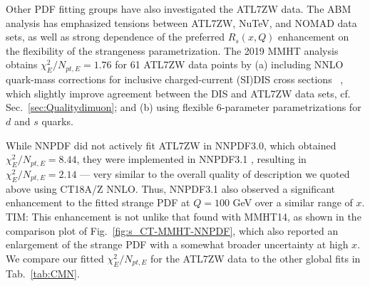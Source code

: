 Other PDF fitting groups have also investigated the ATL7ZW data. 
The ABM analysis \cite{Alekhin:2017olj} has emphasized tensions between ATL7ZW, NuTeV, and NOMAD data sets, as well as strong dependence of the preferred $R_s(x,Q)$ enhancement on the flexibility of the strangeness parametrization. The 2019 MMHT analysis \cite{Thorne:2019mpt}
obtains $\chi^2_E/N_\mathit{pt,E}\!=\! 1.76$
for 61 ATL7ZW data points by (a) 
including NNLO quark-mass corrections for inclusive charged-current (SI)DIS cross sections
~\cite{Berger:2016inr,Gao:2017kkx},
which slightly improve agreement between the DIS and ATL7ZW data sets, cf. Sec.~\ref{sec:Qualitydimuon}; and (b) using flexible 6-parameter parametrizations for $d$ and $s$ quarks. 


While NNPDF did not actively fit
ATL7ZW in NNPDF3.0, which obtained $\chi_E^2/N_\mathit{pt,E}\!=\! 8.44$, they were implemented in NNPDF3.1 \cite{Ball:2017nwa},
resulting in $\chi^2_E/N_\mathit{pt,E}\!=\! 2.14$ --- very similar to the overall quality of description we
quoted above using CT18A/Z NNLO. Thus, NNPDF3.1 also observed a significant enhancement to the
fitted strange PDF at $Q\!=\!100$ GeV over a similar range of $x$.
%
{\color{red}TIM:
This enhancement is not unlike that found with MMHT14, as shown in the comparison plot of Fig.~\ref{fig:s_CT-MMHT-NNPDF},
which also reported an enlargement of the strange PDF with a somewhat broader uncertainty at high $x$.
}
%
We compare our fitted $\chi^{2}_E/N_{pt,E}$
for the ATL7ZW data to the other global fits in Tab.~\ref{tab:CMN}.


